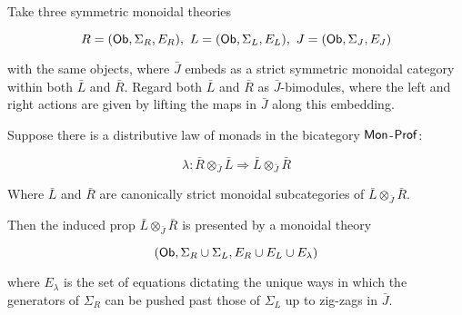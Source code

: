 %
%
%
%
%
%
%
%
%


\begin{lemma}
Take three symmetric monoidal theories

$$
R=({\sf Ob},\Sigma_R ,E_R ), \ L=({\sf Ob},\Sigma_L ,E_L ),  \ J=({\sf Ob},\Sigma_J ,E_J )
$$

with the same objects, where $\bar{J}$ embeds as a strict symmetric monoidal category within both $\bar{L}$ and $\bar{R}$.  Regard both $\bar{L}$ and $\bar{R}$ as  $\bar{J}$-bimodules, where the left and right actions are given by lifting the maps in $\bar{J}$ along this embedding.

Suppose there is a distributive law of monads in the bicategory ${\sf Mon}$-${\sf Prof}$:

$$
\lambda:\bar{R}\otimes_{\bar{J}} \bar{L}\Rightarrow \bar{L}\otimes_{\bar{J}} \bar{R}
$$

Where $\bar{L}$ and $\bar{R}$ are canonically strict monoidal subcategories of $\bar{L}\otimes_{\bar{J}} \bar{R}$.

Then the induced prop $\bar{L}\otimes_{\bar{J}} \bar{R}$ is presented by a monoidal theory

$$
({\sf Ob}, \Sigma_R\cup \Sigma_L, E_R\cup E_L \cup E_\lambda)
$$

where $E_\lambda$ is the set of equations dictating the unique ways in which the generators of $\Sigma_R$ can be pushed past those of $\Sigma_L$ up to zig-zags in $\bar{J}$.
\end{lemma}

